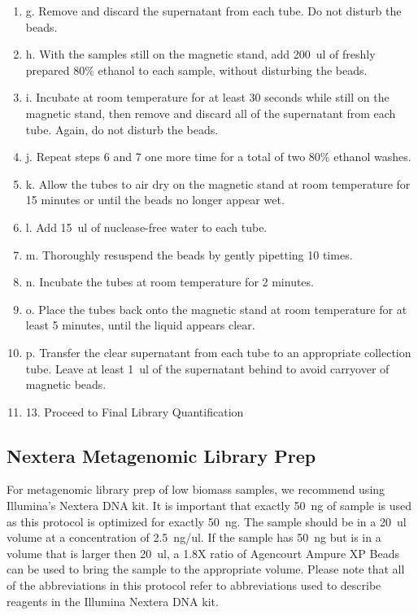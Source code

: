 \documentclass[graybox]{svmult}
\begin{document}
\begin{enumerate}
\item{g.      Remove and discard the supernatant from each tube. Do not disturb the beads.}
\item{h.      With the samples still on the magnetic stand, add 200~ul of freshly prepared 80\% ethanol to each sample, without disturbing the beads.}
\item{i.      Incubate at room temperature for at least 30 seconds while still on the magnetic stand, then remove and discard all of the supernatant from each tube. Again, do not disturb the beads.}
\item{j.      Repeat steps 6 and 7 one more time for a total of two 80\% ethanol washes.}
\item{k.      Allow the tubes to air dry on the magnetic stand at room temperature for 15 minutes or until the beads no longer appear wet.}
\item{l.      Add 15~ul of nuclease-free water to each tube.}
\item{m.      Thoroughly resuspend the beads by gently pipetting 10 times.}
\item{n.      Incubate the tubes at room temperature for 2 minutes.}
\item{o.      Place the tubes back onto the magnetic stand at room temperature for at least 5 minutes, until the liquid appears clear.}
\item{p.      Transfer the clear supernatant from each tube to an appropriate collection tube. Leave at least 1~ul of the supernatant behind to avoid carryover of magnetic beads.}
\item{13.     Proceed to Final Library Quantification}
\end{enumerate}

\subsection{Nextera Metagenomic Library Prep}

For metagenomic library prep of low biomass samples, we recommend using Illumina’s Nextera DNA kit. It is important that exactly 50~ng of sample is used as this protocol is optimized for exactly 50~ng. The sample should be in a 20~ul volume at a concentration of 2.5~ng/ul. If the sample has 50~ng but is in a volume that is larger then 20~ul, a 1.8X ratio of Agencourt Ampure XP Beads can be used to bring the sample to the appropriate volume.  Please note that all of the abbreviations in this protocol refer to abbreviations used to describe reagents in the Illumina Nextera DNA kit.
\end{document}
